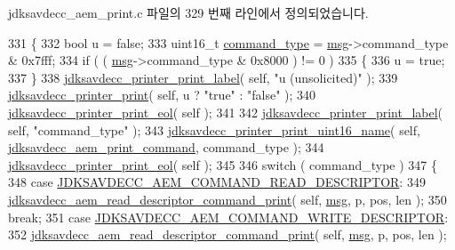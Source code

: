 jdksavdecc\+\_\+aem\+\_\+print.\+c 파일의 329 번째 라인에서 정의되었습니다.


\begin{DoxyCode}
331 \{
332     \textcolor{keywordtype}{bool} u = \textcolor{keyword}{false};
333     uint16\_t \hyperlink{structjdksavdecc__aecpdu__aem_a07f7ee802870e9ae75f021832f59a8a9}{command\_type} = \hyperlink{maap__log__linux_8c_a0c7e58a50354c4a4d6dad428d0e47029}{msg}->command\_type & 0x7fff;
334     \textcolor{keywordflow}{if} ( ( \hyperlink{maap__log__linux_8c_a0c7e58a50354c4a4d6dad428d0e47029}{msg}->command\_type & 0x8000 ) != 0 )
335     \{
336         u = \textcolor{keyword}{true};
337     \}
338     \hyperlink{group__util_gaf7818b24143b3c7502926a425a242ff5}{jdksavdecc\_printer\_print\_label}( \textcolor{keyword}{self}, \textcolor{stringliteral}{"u (unsolicited)"} );
339     \hyperlink{group__util_ga335ac75e0aa3fe66501b752bf9d0f90d}{jdksavdecc\_printer\_print}( \textcolor{keyword}{self}, u ? \textcolor{stringliteral}{"true"} : \textcolor{stringliteral}{"false"} );
340     \hyperlink{group__util_gacda56c9d3d24593a52c999682fa6e6e3}{jdksavdecc\_printer\_print\_eol}( \textcolor{keyword}{self} );
341 
342     \hyperlink{group__util_gaf7818b24143b3c7502926a425a242ff5}{jdksavdecc\_printer\_print\_label}( \textcolor{keyword}{self}, \textcolor{stringliteral}{"command\_type"} );
343     \hyperlink{group__util_ga62486d864a66773d19bbbe23cebf346a}{jdksavdecc\_printer\_print\_uint16\_name}( \textcolor{keyword}{self}, 
      \hyperlink{group__aem__print_gae7bba26850c31fa12c46c66161513148}{jdksavdecc\_aem\_print\_command}, command\_type );
344     \hyperlink{group__util_gacda56c9d3d24593a52c999682fa6e6e3}{jdksavdecc\_printer\_print\_eol}( \textcolor{keyword}{self} );
345 
346     \textcolor{keywordflow}{switch} ( command\_type )
347     \{
348     \textcolor{keywordflow}{case} \hyperlink{group__command_gaa6a32a290cbec71466b571590b05fd00}{JDKSAVDECC\_AEM\_COMMAND\_READ\_DESCRIPTOR}:
349         \hyperlink{group__aem__print_ga966f9d45d0fcc7fd795ae774ee57c422}{jdksavdecc\_aem\_read\_descriptor\_command\_print}( \textcolor{keyword}{self}, 
      \hyperlink{maap__log__linux_8c_a0c7e58a50354c4a4d6dad428d0e47029}{msg}, p, pos, len );
350         \textcolor{keywordflow}{break};
351     \textcolor{keywordflow}{case} \hyperlink{group__command_ga2042c293682f0eb1b948a7be2967f3cb}{JDKSAVDECC\_AEM\_COMMAND\_WRITE\_DESCRIPTOR}:
352         \hyperlink{group__aem__print_ga966f9d45d0fcc7fd795ae774ee57c422}{jdksavdecc\_aem\_read\_descriptor\_command\_print}( \textcolor{keyword}{self}, 
      \hyperlink{maap__log__linux_8c_a0c7e58a50354c4a4d6dad428d0e47029}{msg}, p, pos, len );

\end{DoxyCode}
